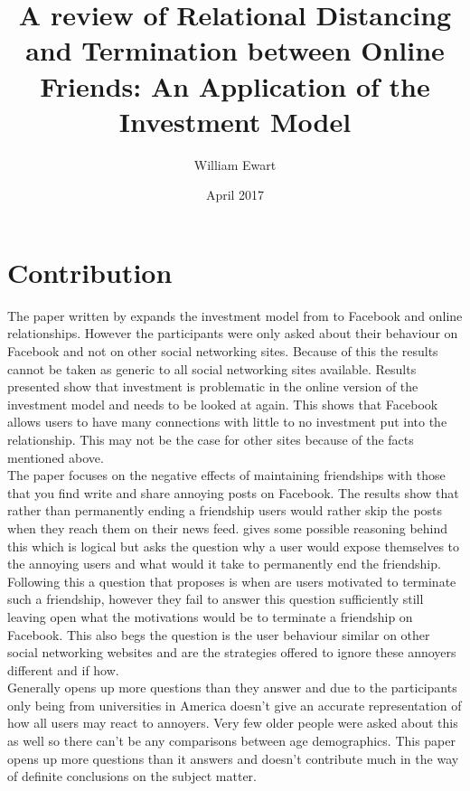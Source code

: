 \documentclass[12pt]{article}
\title{A review of Relational Distancing and Termination between Online Friends: An Application of the Investment Model}
\author{William Ewart}
\date{April 2017}
\begin{document}
\begin{titlingpage}
\maketitle
\tableofcontents
\end{titlingpage}
\newpage
\section{Contribution}
The paper written by \cite{Carpenter} expands the investment model from \cite{Rusbult} to Facebook and online relationships. However the participants were only asked about their behaviour on Facebook and not on other social networking sites. Because of this the results cannot be taken as generic to all social networking sites available. Results presented show that investment is problematic in the online version of the investment model and needs to be looked at again. This shows that Facebook allows users to have many connections with little to no investment put into the relationship. This may not be the case for other sites because of the facts mentioned above. \\
The paper focuses on the negative effects of maintaining friendships with those that you find write and share annoying posts on Facebook. The results show that rather than permanently ending a friendship users would rather skip the posts when they reach them on their news feed. \cite{Carpenter} gives some possible reasoning behind this which is logical but asks the question why a user would expose themselves to the annoying users and what would it take to permanently end the friendship. Following this a question that \cite{Carpenter} proposes is when are users motivated to terminate such a friendship, however they fail to answer this question sufficiently still leaving open what the motivations would be to terminate a friendship on Facebook. This also begs the question is the user behaviour similar on other social networking websites and are the strategies offered to ignore these annoyers different and if how. \\
Generally \cite{Carpenter} opens up more questions than they answer and due to the participants only being from universities in America doesn't give an accurate representation of how all users may react to annoyers. Very few older people were asked about this as well so there can't be any comparisons between age demographics. This paper opens up more questions than it answers and doesn't contribute much in the way of definite conclusions on the subject matter. 
\end{document}
